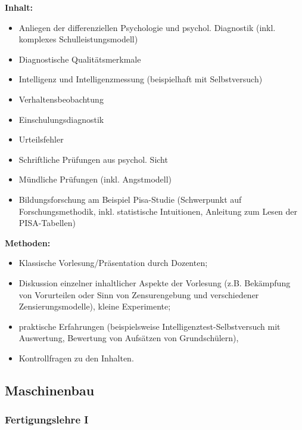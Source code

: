 \documentclass[%
a4paper, %
11pt,               %
leqno,              %
fleqn,              %
]
{scrartcl}
\begin{document}
\textsf{\textbf{Inhalt:}}
\begin{itemize}\itemsep0pt
  \item Anliegen der differenziellen Psychologie und psychol. Diagnostik (inkl.
    komplexes Schulleistungsmodell)
  \item Diagnostische Qualitätsmerkmale
  \item Intelligenz und Intelligenzmessung (beispielhaft mit Selbstversuch)
  \item Verhaltensbeobachtung
  \item Einschulungsdiagnostik
  \item Urteilsfehler
  \item Schriftliche Prüfungen aus psychol. Sicht
  \item Mündliche Prüfungen (inkl. Angstmodell)
  \item Bildungsforschung am Beispiel Pisa-Studie (Schwerpunkt auf
    Forschungsmethodik, inkl. statistische Intuitionen, Anleitung zum Lesen der
    PISA-Tabellen)
\end{itemize}


\textsf{\textbf{Methoden:}}
\begin{itemize}\itemsep0pt
  \item Klassische Vorlesung/Präsentation durch Dozenten;
  \item Diskussion einzelner inhaltlicher Aspekte der Vorlesung (z.B. Bekämpfung
    von Vorurteilen oder Sinn von Zensurengebung und verschiedener
    Zensierungsmodelle), kleine Experimente;
  \item praktische Erfahrungen (beispielsweise Intelligenztest-Selbstversuch mit
    Auswertung, Bewertung von Aufsätzen von Grundschülern),
  \item Kontrollfragen zu den Inhalten.
\end{itemize}


\subsection{Maschinenbau} %
\label{sub:Maschinenbau}

\subsubsection{Fertigungslehre I} %
\label{ssub:Fertigungslehre I}
\end{document}
